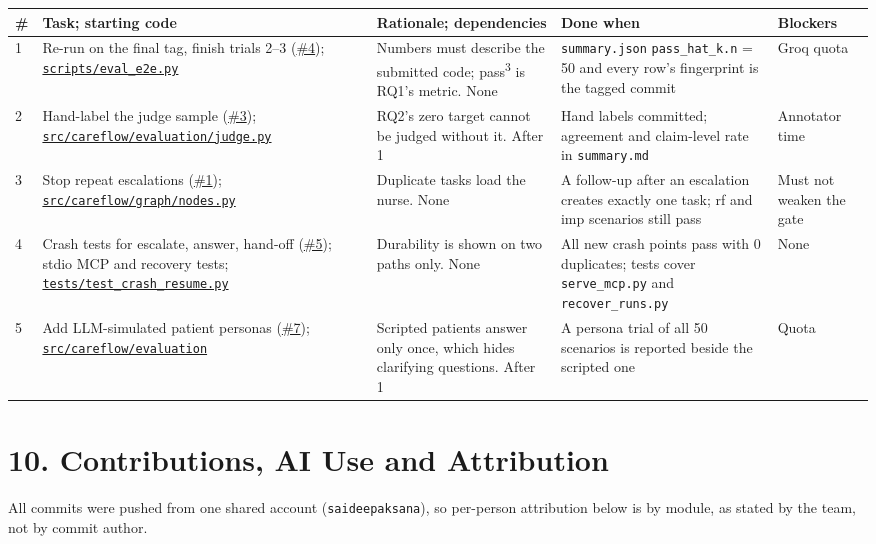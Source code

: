 \documentclass[10pt,a4paper]{article}
\newcommand{\repourl}{https://github.com/saideepaksana/careflow}
\newcommand{\rev}{cs5903-final-2026}
\newcommand{\file}[1]{\href{\repourl/blob/\rev/#1}{\nolinkurl{#1}}}
\newcommand{\dir}[1]{\href{\repourl/tree/\rev/#1}{\nolinkurl{#1}}}
\newcommand{\issue}[1]{\href{\repourl/issues/#1}{\##1}}
\begin{document}
\begin{table}[htbp]
\centering
\footnotesize
\begin{tabularx}{\textwidth}{P{0.25cm} P{3.4cm} P{3.3cm} L P{2.1cm}}
\toprule
\textbf{\#} & \textbf{Task; starting code} & \textbf{Rationale; dependencies} & \textbf{Done when} & \textbf{Blockers} \\
 & Re-run on the final tag, finish trials 2--3 (\issue{4}); \file{scripts/eval_e2e.py} & Numbers must describe the submitted code; pass\textsuperscript{3} is RQ1's metric. None & \texttt{summary.json} \texttt{pass\_hat\_k.n} = 50 and every row's fingerprint is the tagged commit & Groq quota \\
2 & Hand-label the judge sample (\issue{3}); \file{src/careflow/evaluation/judge.py} & RQ2's zero target cannot be judged without it. After 1 & Hand labels committed; agreement and claim-level rate in \texttt{summary.md} & Annotator time \\
3 & Stop repeat escalations (\issue{1}); \file{src/careflow/graph/nodes.py} & Duplicate tasks load the nurse. None & A follow-up after an escalation creates exactly one task; rf and imp scenarios still pass & Must not weaken the gate \\
4 & Crash tests for escalate, answer, hand-off (\issue{5}); stdio MCP and recovery tests; \file{tests/test_crash_resume.py} & Durability is shown on two paths only. None & All new crash points pass with 0 duplicates; tests cover \texttt{serve\_mcp.py} and \texttt{recover\_runs.py} & None \\
5 & Add LLM-simulated patient personas (\issue{7}); \dir{src/careflow/evaluation} & Scripted patients answer only once, which hides clarifying questions. After 1 & A persona trial of all 50 scenarios is reported beside the scripted one & Quota \\
\bottomrule
\end{tabularx}
\end{table}

\FloatBarrier
\section*{10. Contributions, AI Use and Attribution}

All commits were pushed from one shared account (\texttt{saideepaksana}), so per-person attribution below is by module, as stated by the team, not by commit author.
\end{document}
